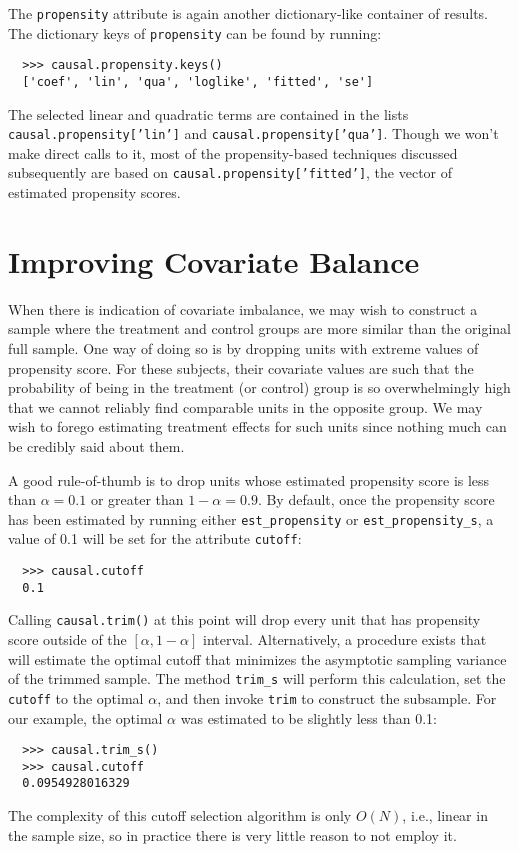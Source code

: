 \documentclass[12pt]{article}
\theoremstyle{definition}
\theoremstyle{definition}
\theoremstyle{definition}
\theoremstyle{remark}
\begin{document}
The \texttt{propensity} attribute is again another dictionary-like container of results. The dictionary keys of \texttt{propensity} can be found by running:
\begin{verbatim}
  >>> causal.propensity.keys()
  ['coef', 'lin', 'qua', 'loglike', 'fitted', 'se']
\end{verbatim}
The selected linear and quadratic terms are contained in the lists \texttt{causal.propensity['lin']} and \texttt{causal.propensity['qua']}. Though we won't make direct calls to it, most of the propensity-based techniques discussed subsequently are based on \texttt{causal.propensity['fitted']}, the vector of estimated propensity scores.


\section{Improving Covariate Balance} \label{sec.d}

When there is indication of covariate imbalance, we may wish to construct a sample where the treatment and control groups are more similar than the original full sample. One way of doing so is by dropping units with extreme values of propensity score. For these subjects, their covariate values are such that the probability of being in the treatment (or control) group is so overwhelmingly high that we cannot reliably find comparable units in the opposite group. We may wish to forego estimating treatment effects for such units since nothing much can be credibly said about them.

A good rule-of-thumb is to drop units whose estimated propensity score is less than $\alpha=0.1$ or greater than $1-\alpha=0.9$. By default, once the propensity score has been estimated by running either \texttt{est\_propensity} or \texttt{est\_propensity\_s}, a value of 0.1 will be set for the attribute \texttt{cutoff}:

\begin{verbatim}
  >>> causal.cutoff
  0.1
\end{verbatim}

Calling \texttt{causal.trim()} at this point will drop every unit that has propensity score outside of the $[\alpha, 1-\alpha]$ interval. Alternatively, a procedure exists that will estimate the optimal cutoff that minimizes the asymptotic sampling variance of the trimmed sample. The method \texttt{trim\_s} will perform this calculation, set the \texttt{cutoff} to the optimal $\alpha$, and then invoke \texttt{trim} to construct the subsample. For our example, the optimal $\alpha$ was estimated to be slightly less than 0.1:
\begin{verbatim}
  >>> causal.trim_s()
  >>> causal.cutoff
  0.0954928016329
\end{verbatim}
The complexity of this cutoff selection algorithm is only $O(N)$, i.e., linear in the sample size, so in practice there is very little reason to not employ it.
\end{document}
